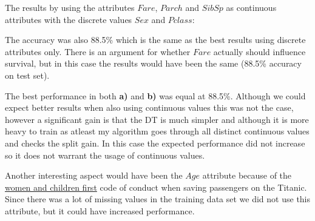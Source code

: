 \documentclass[11pt, english]{../Template/NTNUoving}
\begin{document}
\begin{oppgave}
\begin{punkt}
        The results by using the attributes $Fare$, $Parch$ and $SibSp$ as continuous attributes with the discrete values $Sex$ and $Pclass$:
        \clearpage

        The accuracy was also 88.5\% which is the same as the best results using discrete attributes only. There is an argument for whether
        $Fare$ actually should influence survival, but in this case the results would have been the same (88.5\% accuracy on test set).

    \end{punkt}

    \begin{punkt}
        The best performance in both \textbf{a)} and \textbf{b)} was equal at 88.5\%. Although we could expect better results when also using
        continuous values this was not the case, however a significant gain is that the DT is much simpler and although it is more heavy to train as atleast my algorithm goes
        through all distinct continuous values and checks the split gain. In this case the expected performance did not increase so it does not warrant the usage of continuous values.

        Another interesting aspect would have been the $Age$ attribute because of the \href{https://en.wikipedia.org/wiki/Women_and_children_first}{women and children first}
        code of conduct when saving passengers on the Titanic. Since there was a lot of missing values in the training data set we did not use this attribute, but it could have increased performance.


\end{punkt}
\end{oppgave}
\end{document}
